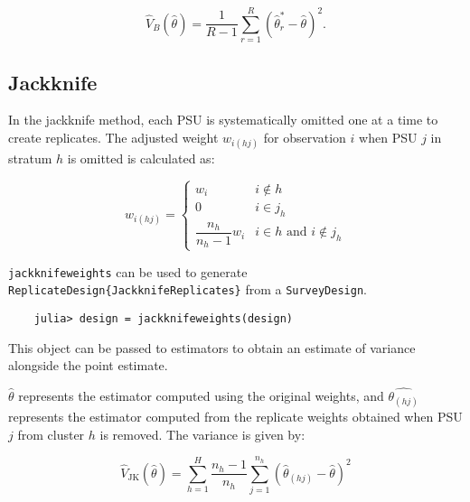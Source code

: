 \documentclass{juliacon}
\begin{document}
\begin{equation}
        \hat{V}_B(\hat{\theta}) = \dfrac{1}{R-1}\sum_{r=1}^{R} (\hat{\theta}^*_r - \hat{\theta})^2.
\end{equation}


\subsection{Jackknife}
In the jackknife method, each PSU is systematically omitted one at a time to create replicates. The adjusted weight \( w_{i(hj)} \) for observation \( i \) when PSU \( j \) in stratum \( h \) is omitted is calculated as:

\begin{equation}
    w_{i(hj)} = \begin{cases}
        w_i & i \notin h\\
    0 & i \in j_{h} \\
    \dfrac{n_h}{n_h - 1} w_i &  i \in h \text{ and } i \notin j_{h}
    \end{cases} %
    \end{equation} \cite{Lohr}

\verb|jackknifeweights| can be used to generate \verb|ReplicateDesign{JackknifeReplicates}| from a \verb|SurveyDesign|. 

\begin{lstlisting}
    julia> design = jackknifeweights(design)
    \end{lstlisting}


This object can be passed to estimators to obtain an estimate of variance alongside the point estimate. 

$\hat{\theta}$ represents the estimator computed using the original weights, and $\hat{\theta_{(hj)}}$ represents the estimator computed from the replicate weights obtained when PSU $j$ from cluster $h$ is removed. The variance is given by: 

\begin{equation}
\hat{V}_{\text{JK}}(\hat{\theta}) = \sum_{h = 1}^H \dfrac{n_h - 1}{n_h}\sum_{j = 1}^{n_h}(\hat{\theta}_{(hj)} - \hat{\theta})^2
\end{equation}
\end{document}
